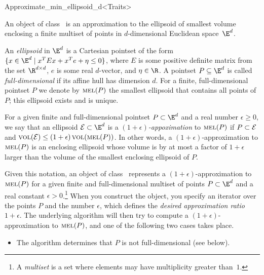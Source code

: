 \begin{ccRefClass}{Approximate_min_ellipsoid_d<Traits>}


\ccSaveThreeColumns

\ccDefinition

An object of class \ccRefName\ is an approximation to the
ellipsoid of smallest volume enclosing a finite multiset of points
in $d$-dimensional Euclidean space~$\E^d$.

An \emph{ellipsoid} in $\E^d$ is a Cartesian pointset of the form $\{
x\in\E^d \mid x^T E x + x^T e + \eta\leq 0 \}$, where $E$ is some
positive definite matrix from the set $\R^{d\times d}$, $e$ is some
real $d$-vector, and $\eta\in\R$.  A pointset $P\subseteq \E^d$ is
called \emph{full-dimensional} if its affine hull has dimension $d$.
For a finite, full-dimensional pointset $P$ we denote by $\mathop{{\textsc{mel}}}\nolimits(P)$ the
smallest ellipsoid that contains all points of $P$; this ellipsoid
exists and is unique.


For a given finite and full-dimensional pointset $P\subset \E^d$ and a
real number $\epsilon\ge 0$, we say that an ellipsoid ${\cal
E}\subset\E^d$ is a \emph{$(1+\epsilon)$-appoximation} to $\mathop{{\textsc{mel}}}\nolimits(P)$ if
$P\subset {\cal E}$ and $\mathop{{\textsc{vol}}}\nolimits({\cal E}) \leq (1+\epsilon)
\mathop{{\textsc{vol}}}\nolimits(\mathop{{\textsc{mel}}}\nolimits(P))$.  In other words, a $(1+\epsilon)$-approximation to
$\mathop{{\textsc{mel}}}\nolimits(P)$ is an enclosing ellipsoid whose volume is by at most a
factor of $1+\epsilon$ larger than the volume of the smallest
enclosing ellipsoid of $P$.

Given this notation, an object of class \ccRefName\ represents a
$(1+\epsilon)$-approximation to $\mathop{{\textsc{mel}}}\nolimits(P)$ for a given finite and
full-dimensional multiset of points $P\subset\E^d$ and a real constant
$\epsilon>0$.\footnote{A \emph{multiset} is a set where elements may
have multiplicity greater than~$1$.} When you construct the object,
you specify an iterator over the points $P$ and the number $\epsilon$,
which defines the \emph{desired approximation ratio} $1+\epsilon$.
The underlying algorithm will then try to compute a
$(1+\epsilon)$-approximation to $\mathop{{\textsc{mel}}}\nolimits(P)$, and one of the following
two cases takes place.
\begin{itemize}
\item The algorithm determines that $P$ is not full-dimensional (see
   below).


\end{itemize}
\end{ccRefClass}
